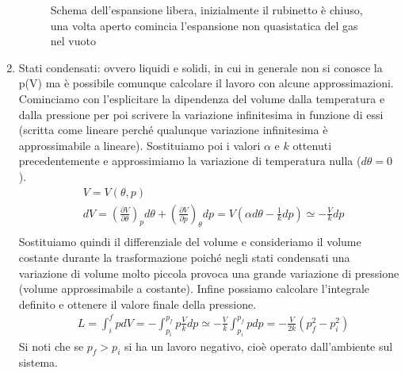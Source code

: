 \documentclass[10pt,a4paper]{article}
\begin{document}
\begin{enumerate}
\begin{figure}[h!]
		\caption{Schema dell'espansione libera, inizialmente il rubinetto è chiuso, una volta aperto comincia l'espansione non quasistatica del gas nel vuoto}
		\label{fig:espansione_libera}
	\end{figure}
	\FloatBarrier
	\item Stati condensati: ovvero liquidi e solidi, in cui in generale non si conosce la p(V) ma è possibile comunque calcolare il lavoro con alcune approssimazioni. Cominciamo con l'esplicitare la dipendenza del volume dalla temperatura e dalla pressione per poi scrivere la variazione infinitesima in funzione di essi (scritta come lineare perché qualunque variazione infinitesima è approssimabile a lineare). Sostituiamo poi i valori $\alpha$ e $k$ ottenuti precedentemente e approssimiamo la variazione di temperatura nulla ($d\theta = 0$).  
	\begin{align*}
		&V = V(\theta, p)\\
		&dV = \left(\frac{\partial V}{\partial \theta}\right)_p d\theta + \left(\frac{\partial V}{\partial p}\right)_{\theta} dp = V(\alpha d\theta-\frac{1}{k} dp)\simeq-\frac{V}{k}dp\\
	\end{align*} 
Sostituiamo quindi il differenziale del volume e consideriamo il volume costante durante la trasformazione poiché negli stati condensati una variazione di volume molto piccola provoca una grande variazione di pressione (volume approssimabile a costante). Infine possiamo calcolare l'integrale definito e ottenere il valore finale della pressione. 
\begin{align*}
	&L=\int_{i}^{f}pdV = -\int_{p_i}^{p_f}p\frac{V}{k}dp \simeq -\frac{V}{k}\int_{p_i}^{p_f}pdp = -\frac{V}{2k}\left(p_f^2-p_i^2\right)
\end{align*}
Si noti che se $p_f > p_i$ si ha un lavoro negativo, cioè operato dall'ambiente sul sistema. 
\end{enumerate}
\end{document}
